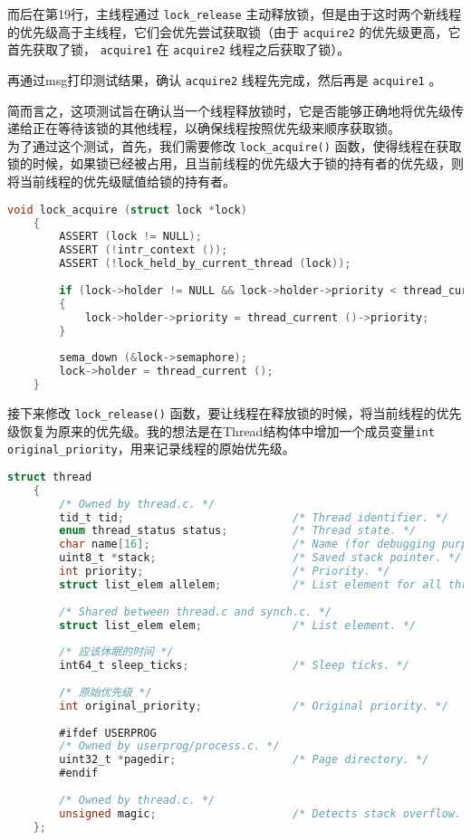 \documentclass{article}
\begin{document}
	而后在第19行，主线程通过 \texttt{lock\_release} 主动释放锁，但是由于这时两个新线程的优先级高于主线程，它们会优先尝试获取锁（由于 \texttt{acquire2} 的优先级更高，它首先获取了锁， \texttt{acquire1} 在 \texttt{acquire2} 线程之后获取了锁）。
	
	再通过msg打印测试结果，确认 \texttt{acquire2} 线程先完成，然后再是 \texttt{acquire1} 。
	
	简而言之，这项测试旨在确认当一个线程释放锁时，它是否能够正确地将优先级传递给正在等待该锁的其他线程，以确保线程按照优先级来顺序获取锁。\\[1em]
	
	为了通过这个测试，首先，我们需要修改 \texttt{lock\_acquire()} 函数，使得线程在获取锁的时候，如果锁已经被占用，且当前线程的优先级大于锁的持有者的优先级，则将当前线程的优先级赋值给锁的持有者。
	
	\begin{lstlisting}[language=C, title=修改后的\texttt{lock\_acquire()}函数]
    void lock_acquire (struct lock *lock)
    {
    	ASSERT (lock != NULL);
    	ASSERT (!intr_context ());
    	ASSERT (!lock_held_by_current_thread (lock));
    	
    	if (lock->holder != NULL && lock->holder->priority < thread_current ()->priority)
    	{
    		lock->holder->priority = thread_current ()->priority;
    	}
    	
    	sema_down (&lock->semaphore);
    	lock->holder = thread_current ();
    }
	\end{lstlisting}
	
	接下来修改 \texttt{lock\_release()} 函数，要让线程在释放锁的时候，将当前线程的优先级恢复为原来的优先级。我的想法是在Thread结构体中增加一个成员变量\texttt{int original\_priority}，用来记录线程的原始优先级。
	
	\begin{lstlisting}[language=C, title=修改后的线程结构体]
    struct thread
    {
    	/* Owned by thread.c. */
    	tid_t tid;                          /* Thread identifier. */
    	enum thread_status status;          /* Thread state. */
    	char name[16];                      /* Name (for debugging purposes). */
    	uint8_t *stack;                     /* Saved stack pointer. */
    	int priority;                       /* Priority. */
    	struct list_elem allelem;           /* List element for all threads list. */
    	
    	/* Shared between thread.c and synch.c. */
    	struct list_elem elem;              /* List element. */
    	
    	/* 应该休眠的时间 */
    	int64_t sleep_ticks;                /* Sleep ticks. */
    	
    	/* 原始优先级 */
    	int original_priority;              /* Original priority. */
    	
    	#ifdef USERPROG
    	/* Owned by userprog/process.c. */
    	uint32_t *pagedir;                  /* Page directory. */
    	#endif
    	
    	/* Owned by thread.c. */
    	unsigned magic;                     /* Detects stack overflow. */
    };
	\end{lstlisting}
	
\end{document}

